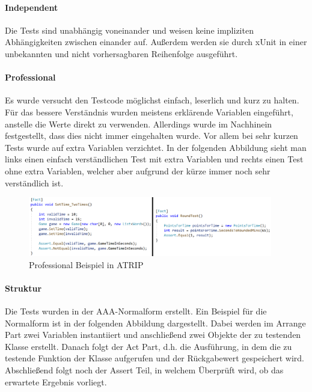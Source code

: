 \paragraph{Independent}
Die Tests sind unabhängig voneinander und weisen keine impliziten Abhängigkeiten zwischen einander auf. Außerdem werden sie durch xUnit in einer unbekannten und nicht vorhersagbaren Reihenfolge ausgeführt.

\paragraph{Professional}
Es wurde versucht den Testcode möglichst einfach, leserlich und kurz zu halten. Für das bessere Verständnis wurden meistens erklärende Variablen eingeführt, anstelle die Werte direkt zu verwenden. Allerdings wurde im Nachhinein festgestellt, dass dies nicht immer eingehalten wurde. Vor allem bei sehr kurzen Tests wurde auf extra Variablen verzichtet. In der folgenden Abbildung sieht man links einen einfach verständlichen Test mit extra Variablen und rechts einen Test ohne extra Variablen, welcher aber aufgrund der kürze immer noch sehr verständlich ist.

\begin{figure}[!htb]
\centering
\includegraphics[width=0.95\textwidth]{Bilder/professional_example.PNG}
\caption{\label{Abb:professional_example} Professional Beispiel in ATRIP}
\end{figure}


\paragraph{Struktur}
Die Tests wurden in der AAA-Normalform erstellt. Ein Beispiel für die Normalform ist in der folgenden Abbildung dargestellt. Dabei werden im \glqq Arrange\grqq{} Part zwei Variablen instantiiert und anschließend zwei Objekte der zu testenden Klasse erstellt. Danach folgt der \glqq Act\grqq{} Part, d.h. die Ausführung, in dem die zu testende Funktion der Klasse aufgerufen und der Rückgabewert gespeichert wird. Abschließend folgt noch der \glqq Assert\grqq{} Teil, in welchem Überprüft wird, ob das erwartete Ergebnis vorliegt.


